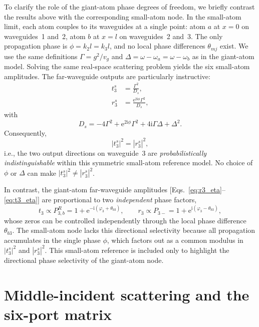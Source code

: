 \documentclass[aps,pra,reprint,superscriptaddress,nofootinbib,longbibliography,floatfix]{revtex4-2}
\newcommand{\ii}{\mathrm{i}}
\newcommand{\ee}{\mathrm{e}}
\newcommand{\Del}{\Delta}
\newcommand{\Gam}{\Gamma}
\newcommand{\ph}{\varphi}
\newcommand{\thbthree}{\theta_{b3}}
\begin{document}
To clarify the role of the giant-atom phase degrees of freedom, we briefly contrast the results above with the corresponding small-atom node.
In the small-atom limit, each atom couples to its waveguides at a single point: atom $a$ at $x=0$ on waveguides~1 and~2, atom $b$ at $x=l$ on waveguides~2 and~3.
The only propagation phase is $\phi=k_2l=k_3l$, and no local phase differences $\theta_{mj}$ exist.
We use the same definitions $\Gam=g^2/v_g$ and $\Del=\omega-\omega_a=\omega-\omega_b$ as in the giant-atom model.
Solving the same real-space scattering problem yields the six small-atom amplitudes.
The far-waveguide outputs are particularly instructive:
\begin{subequations}
\begin{align}
t_3^s &= \frac{\Gam^2}{D_s},\\
r_3^s &= \frac{\ee^{2\ii\phi}\Gam^2}{D_s},
\end{align}
\end{subequations}
with
\begin{equation}
  D_s = -4\Gam^2 + \ee^{2\ii\phi}\Gam^2 + 4\ii\Gam\Del + \Del^2.
\end{equation}
Consequently,
\begin{equation}
  |t_3^s|^2 = |r_3^s|^2,
\end{equation}
i.e., the two output directions on waveguide~3 are \emph{probabilistically indistinguishable} within this symmetric small-atom reference model.
No choice of $\phi$ or $\Del$ can make $|t_3^s|^2\neq|r_3^s|^2$.

In contrast, the giant-atom far-waveguide amplitudes [Eqs.~\eqref{eq:r3_eta}--\eqref{eq:t3_eta}] are proportional to two \emph{independent} phase factors,
\begin{equation}
  t_3 \propto P_{3,b}^{R} = 1+\ee^{-\ii(\ph_3+\thbthree)},\qquad
  r_3 \propto P_{3-} = 1+\ee^{\ii(\ph_3-\thbthree)},
\end{equation}
whose zeros can be controlled independently through the local phase difference $\thbthree$.
The small-atom node lacks this directional selectivity because all propagation accumulates in the single phase $\phi$, which factors out as a common modulus in $|t_3^s|^2$ and $|r_3^s|^2$.
This small-atom reference is included only to highlight the directional phase selectivity of the giant-atom node.

\section{Middle-incident scattering and the six-port matrix}
\label{sec:wg2}
\end{document}
